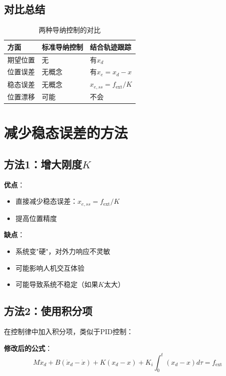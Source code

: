 \documentclass[12pt,a4paper]{article}
\begin{document}
\subsection{对比总结}

\begin{table}[h]
\centering
\begin{tabular}{|l|l|l|}
\hline
\textbf{方面} & \textbf{标准导纳控制} & \textbf{结合轨迹跟踪} \\
\hline
期望位置 & 无 & 有$x_d$ \\
\hline
位置误差 & 无概念 & 有$x_e = x_d - x$ \\
\hline
稳态误差 & 无概念 & $x_{e,ss} = f_{\text{ext}}/K$ \\
\hline
位置漂移 & 可能 & 不会 \\
\hline
\end{tabular}
\caption{两种导纳控制的对比}
\end{table}

\section{减少稳态误差的方法}

\subsection{方法1：增大刚度$K$}

\textbf{优点}：
\begin{itemize}
\item 直接减少稳态误差：$x_{e,ss} = f_{\text{ext}}/K$
\item 提高位置精度
\end{itemize}

\textbf{缺点}：
\begin{itemize}
\item 系统变"硬"，对外力响应不灵敏
\item 可能影响人机交互体验
\item 可能导致系统不稳定（如果$K$太大）
\end{itemize}

\subsection{方法2：使用积分项}

在控制律中加入积分项，类似于PID控制：

\textbf{修改后的公式}：
\begin{equation}
M\ddot{x}_d + B(\dot{x}_d - \dot{x}) + K(x_d - x) + K_i \int_0^t (x_d - x) d\tau = f_{\text{ext}} \tag{**}
\end{equation}
\end{document}
